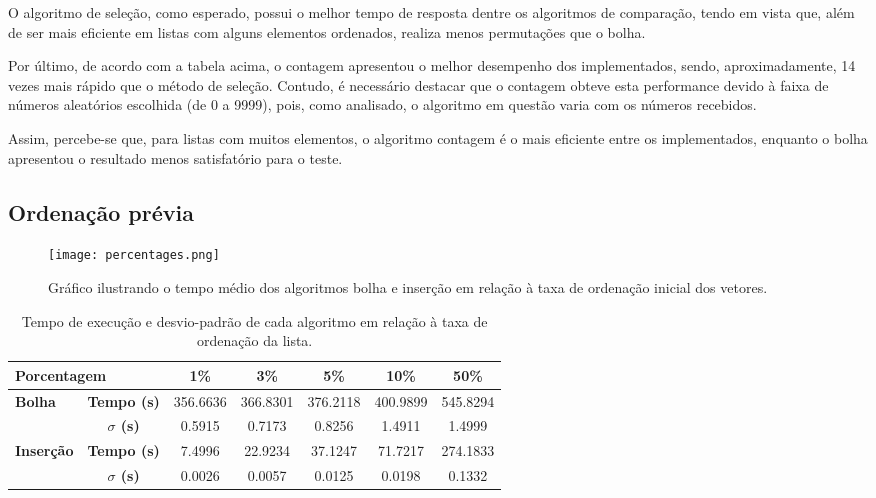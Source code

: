 O algoritmo de seleção, como esperado, possui o melhor tempo de resposta dentre os algoritmos de comparação, tendo em vista que, além de ser mais eficiente em listas com alguns elementos ordenados, realiza menos permutações que o bolha. 

Por último, de acordo com a tabela acima, o contagem apresentou o melhor desempenho dos implementados, sendo, aproximadamente, 14 vezes mais rápido que o método de seleção. Contudo, é necessário destacar que o contagem obteve esta performance devido à faixa de números aleatórios escolhida (de 0 a 9999), pois, como analisado, o algoritmo em questão varia com os números recebidos.

Assim, percebe-se que, para listas com muitos elementos, o algoritmo contagem é o mais eficiente entre os implementados, enquanto o bolha apresentou o resultado menos satisfatório para o teste.

\newpage
\subsection{Ordenação prévia}
\begin{figure}[h]
    \texttt{[image: percentages.png]}
    \caption{Gráfico ilustrando o tempo médio dos algoritmos bolha e inserção em relação à taxa de ordenação inicial dos vetores.}
\end{figure}
\def\arraystretch{1.5}
\setlength\arrayrulewidth{0.3pt}
\begin{table}[h]
    \begin{tabular}{|l|c|c|c|c|c|c|}
        \hline
        \multicolumn{2}{|l|}{\textbf{Porcentagem} }& \textbf{1\%} & \textbf{3\%} & \textbf{5\%} & \textbf{10\%} & \textbf{50\%} \\
        \hline
        \multirow{2}{*}{\textbf{Bolha}} & \textbf{Tempo (s)} & \num{356.6636} & \num{366.8301} & \num{376.2118} & \num{400.9899} & \num{545.8294} \\
        \cline{2-7}
        & \textbf{$\sigma$ (s)} & 0.5915 & 0.7173 & 0.8256 & 1.4911 & 1.4999 \\
        \hline
        \multirow{2}{*}{\textbf{Inserção}} & \textbf{Tempo (s)} & 7.4996 & 22.9234 & 37.1247 & 71.7217 & 274.1833 \\
        \cline{2-7}
        & \textbf{$\sigma$ (s)} & 0.0026 & 0.0057 & 0.0125 & 0.0198 & 0.1332 \\
        \hline
    \end{tabular}
    \caption{Tempo de execução e desvio-padrão de cada algoritmo em relação à taxa de ordenação da lista.}
    \label{tab:tempos_desvios_algoritmos_transposta}
\end{table}





